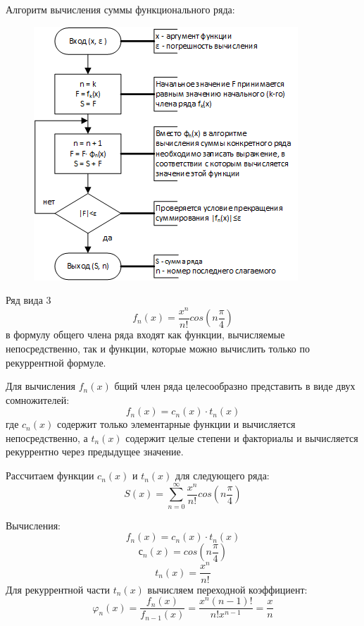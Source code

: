 \documentclass{beamer}
\begin{document}
\begin{frame}
Алгоритм вычисления суммы функционального ряда:
\begin{figure}[h]
\centering
\includegraphics[scale=0.75]{images/lec05-pic04.png}
\end{figure}
\end{frame}

\begin{frame}
\begin{block}{Ряд вида 3}
\[f_n(x)=\frac{x^{n}}{n!}cos(n\frac{\pi}{4})\]
в формулу общего члена ряда входят как функции, вычисляемые непосредственно, так и функции, которые можно вычислить только по рекуррентной формуле. 
\end{block}
Для вычисления $f_n(x)$ бщий член ряда целесообразно представить в виде двух сомножителей: 
\[f_n(x)=c_n(x)\cdot t_n(x)\]
где $c_n(x)$ содержит только элементарные функции и вычисляется непосредственно, а $t_n(x)$ содержит целые степени и факториалы и вычисляется рекуррентно через предыдущее значение.
\end{frame}

\begin{frame}
Рассчитаем функции $c_n(x)$ и $t_n(x)$ для следующего ряда:
\[S(x)= \sum\limits_{n=0}^\infty \frac{x^{n}}{n!}cos(n\frac{\pi}{4})\]

Вычисления:
\[f_n(x)=c_n(x)\cdot t_n(x)\]
\[с_n(x)=cos(n\frac{\pi}{4})\]
\[t_n(x)=\frac{x^n}{n!}\]
Для рекуррентной части $t_n(x)$ вычисляем переходной коэффициент: 
\[\varphi_n(x)=\frac{f_n(x)}{f_{n-1}(x)}= \frac{x^{n}(n-1)!}{n!x^{n-1}}=\frac{x}{n}\]
\end{frame}
\end{document}
